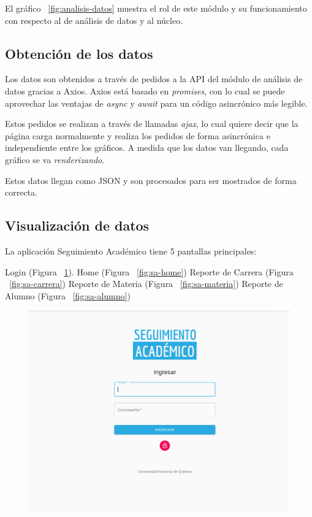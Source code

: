 El gráfico ~\ref{fig:analisis-datos} muestra el rol de este módulo y su funcionamiento con respecto al de análisis de datos y al núcleo.

\subsection{Obtención de los datos}

Los datos son obtenidos a través de pedidos a la API del módulo de análisis de datos gracias a Axios.
Axios está basado en \textit{promises}, con lo cual se puede aprovechar las ventajas de \textit{async} y \textit{await} para un código asincrónico más legible.

Estos pedidos se realizan a través de llamadas \textit{ajax}, lo cual quiere decir que la página carga normalmente y realiza los pedidos de forma asincrónica e independiente entre los gráficos. A medida que los datos van llegando, cada gráfico se va \textit{renderizando}.

Estos datos llegan como JSON y son procesados para ser mostrados de forma correcta.


\subsection{Visualización de datos}

La aplicación Seguimiento Académico tiene 5 pantallas principales:
\begin{outline}
 \1 Login (Figura ~\ref{fig:sa-login}).
 \1 Home (Figura ~\ref{fig:sa-home})
 \1 Reporte de Carrera (Figura ~\ref{fig:sa-carrera})
 \1 Reporte de Materia (Figura ~\ref{fig:sa-materia})
 \1 Reporte de Alumno (Figura ~\ref{fig:sa-alumno})
\end{outline}


\begin{figure}[!htbp]
  \centering
    \includegraphics[scale=0.3]{images/seguimiento-academico/sa-login.png}
  \label{fig:sa-login}
\end{figure}


